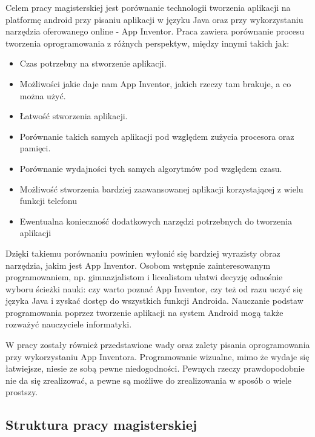 Celem pracy magisterskiej jest porównanie technologii tworzenia aplikacji na platformę android przy pisaniu aplikacji w języku Java oraz przy wykorzystaniu narzędzia oferowanego online - App Inventor. Praca zawiera porównanie procesu tworzenia oprogramowania z różnych perspektyw, między innymi takich jak:
\begin{itemize}
\item Czas potrzebny na stworzenie aplikacji.
\item Możliwości jakie daje nam App Inventor, jakich rzeczy tam brakuje, a co można użyć.
\item Łatwość stworzenia aplikacji.
\item Porównanie takich samych aplikacji pod względem zużycia procesora oraz pamięci.
\item Porównanie wydajności tych samych algorytmów pod względem czasu.
\item Możliwość stworzenia bardziej zaawansowanej aplikacji korzystającej z wielu funkcji telefonu
\item Ewentualna konieczność dodatkowych narzędzi potrzebnych do tworzenia aplikacji
\end{itemize}

Dzięki takiemu porównaniu powinien wyłonić się bardziej wyrazisty obraz narzędzia, jakim jest App Inventor.  Osobom wstępnie zainteresowanym programowaniem, np.  gimnazjalistom i licealistom ułatwi decyzję odnośnie wyboru ścieżki nauki: czy warto poznać App Inventor, czy też od razu uczyć się języka Java i zyskać dostęp do wszystkich funkcji Androida. Nauczanie podstaw programowania poprzez tworzenie aplikacji na system Android mogą także  rozważyć nauczyciele informatyki. 


W pracy zostały również przedstawione wady oraz zalety pisania oprogramowania przy wykorzystaniu App Inventora. Programowanie wizualne, mimo że wydaje się łatwiejsze, niesie ze sobą pewne niedogodności. Pewnych rzeczy prawdopodobnie nie da się zrealizować, a pewne są możliwe do zrealizowania w sposób o wiele prostszy. 


\subsection{Struktura pracy magisterskiej}

